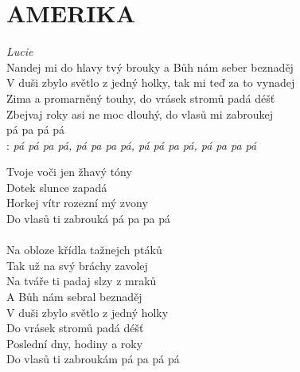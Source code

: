 \section*{\Huge AMERIKA}
\emph{Lucie}\\

Nandej mi do hlavy tvý brouky a Bůh nám seber beznaděj\\
V duši zbylo světlo z jedný holky, tak mi teď za to vynadej\\
Zima a promarněný touhy, do vrásek stromů padá déšť\\
Zbejvaj roky asi ne moc dlouhý, do vlasů mi zabroukej\\
pá pa pá pá\\

\textregistered:
\emph{
pá pá pa pá, pá pa pa pá, pá pá pa pá, pá pa pa pá\\
}

Tvoje voči jen žhavý tóny\\
Dotek slunce zapadá\\
Horkej vítr rozezní mý zvony\\
Do vlasů ti zabrouká pá pa pa pá\\
\textregistered\\

Na obloze křídla tažnejch ptáků\\
Tak už na svý bráchy zavolej\\
Na tváře ti padaj slzy z mraků\\
A Bůh nám sebral beznaděj\\
V duši zbylo světlo z jedný holky\\
Do vrásek stromů padá déšť\\
Poslední dny, hodiny a roky\\
Do vlasů ti zabroukám pá pa pá pá\\

\textregistered\\

\newpage
